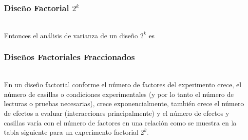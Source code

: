 \documentclass[12pt]{beamer}
\begin{document}
\begin{frame}
\frametitle{Diseño Factorial $ 2^{k} $}
~\\Entonces el análisis de varianza de un diseño $2^k$ es
\begin{table}[H]
  \centering
  \caption{Análisis de varianza diseño $2^k$}
  \label{tab:addlabel}%
\end{table}%
\end{frame}

\begin{frame}
\frametitle{Diseños Factoriales Fraccionados}
~\\En un diseño factorial conforme el número de factores del experimento crece, el número de casillas o condiciones experimentales (y por lo tanto el número de lecturas o pruebas necesarias), crece exponencialmente, también crece el número de efectos a evaluar (interacciones principalmente) y el número de efectos y casillas varía con el número de factores en una relación como se muestra en la tabla siguiente para un experimento factorial $2^k$.
\end{frame}
\end{document}

